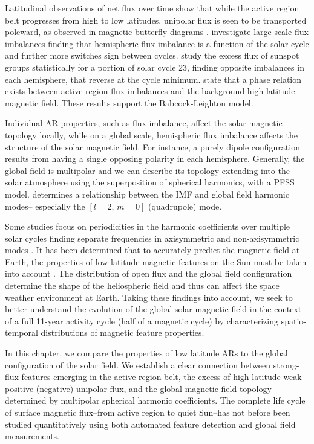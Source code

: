 Latitudinal observations of net flux over time show that while the active region belt progresses from high to low latitudes, unipolar flux is seen to be transported poleward, as observed in magnetic butterfly diagrams \citep{Harvey:1992}. \citet{Choudhary:2002} investigate large-scale flux imbalances finding that hemispheric flux imbalance is a function of the solar cycle and further more switches sign between cycles. \citet{zharkov:2006} study the excess flux of sunspot groups statistically for a portion of solar cycle 23, finding opposite imbalances in each hemisphere, that reverse at the cycle minimum. \citet{Zharkov:2008} state that a phase relation exists between active region flux imbalances and the background high-latitude magnetic field. These results support the Babcock-Leighton model.

Individual \gls{AR} properties, such as flux imbalance, affect the solar magnetic topology locally, while on a global scale, hemispheric flux imbalance affects the structure of the solar magnetic field. For instance, a purely dipole configuration results from having a single opposing polarity in each hemisphere. 
Generally, the global field is multipolar and we can describe its topology extending into the solar atmosphere using the superposition of spherical harmonics, with a \gls{PFSS} model. 
\citet{mordvinov:2007} determines a relationship between the IMF and global field harmonic modes-- especially the $[l=2,\,m=0]$ (quadrupole) mode.

Some studies focus on periodicities in the harmonic coefficients over multiple solar cycles finding separate frequencies in axisymmetric and non-axisymmetric modes \citep{stenflo:1986, stenflo:1988, knaack:2005}.
It has been determined that to accurately predict the magnetic field at Earth, the properties of low latitude magnetic features on the Sun must be taken into account \citep{schussler:2006, wang:2003a, Schrijver:2003}. The distribution of open flux and the global field configuration determine the shape of the heliospheric field and thus can affect the space weather environment at Earth.
Taking these findings into account, we seek to better understand the evolution of the global solar magnetic field in the context of a full 11-year activity cycle (half of a magnetic cycle) by characterizing spatio-temporal distributions of magnetic feature properties.

In this chapter, we compare the properties of low latitude \glspl{AR} to the global configuration of the solar field. We establish a clear connection between strong-flux features emerging in the active region belt, the excess of high latitude weak positive (negative) unipolar flux, and the global magnetic field topology determined by multipolar spherical harmonic coefficients. The complete life cycle of surface magnetic flux--from active region to quiet Sun--has not before been studied quantitatively using both automated feature detection and global field measurements.  

